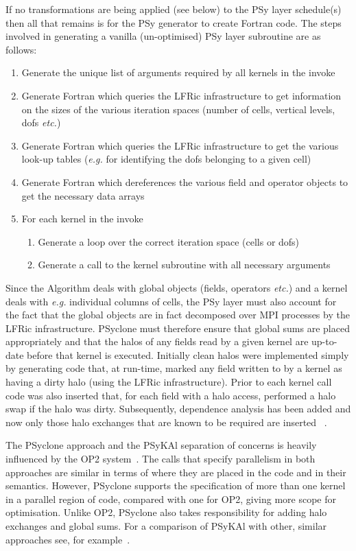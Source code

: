 \documentclass[review,times]{elsarticle}
\begin{document}
If no transformations are being applied (see below) to the PSy layer
schedule(s) then all that remains is for the PSy generator to create
Fortran code.  The steps involved in generating a vanilla
(un-optimised) PSy layer subroutine are as follows:
\begin{enumerate}
\item Generate the unique list of arguments required by all kernels
  in the invoke
\item Generate Fortran which queries the LFRic infrastructure to get
  information on the sizes of the various iteration spaces (number of cells,
  vertical levels, dofs {\em etc.})
\item Generate Fortran which queries the LFRic infrastructure to get the
  various look-up tables ({\em e.g.} for identifying the dofs belonging to a
  given cell)
\item Generate Fortran which dereferences the various field and operator
  objects to get the necessary data arrays
\item For each kernel in the invoke
  \begin{enumerate}
    \item Generate a loop over the correct iteration space (cells or dofs)
    \item Generate a call to the kernel subroutine with all necessary arguments
  \end{enumerate}
\end{enumerate}

Since the Algorithm deals with global objects
(fields, operators {\em etc.})  and a kernel deals with {\em e.g.} individual
columns of cells, the PSy layer must also account for the fact that
the global objects are in fact decomposed over MPI processes by the
LFRic infrastructure. PSyclone must therefore ensure that global sums
are placed appropriately and that the halos of any fields read by a
given kernel are up-to-date before that kernel is executed. Initially
clean halos were implemented simply by generating code that, at
run-time, marked any field written to by a kernel as having a dirty
halo (using the LFRic infrastructure). Prior to each kernel call code
was also inserted that, for each field with a halo access, performed a
halo swap if the halo was dirty. Subsequently, dependence analysis has
been added and now only those halo exchanges that are known to be
required are inserted ~\cite{psyclone}.

The PSyclone approach and the {PS}y{KA}l separation of concerns is
heavily influenced by the OP2 system~\citep{OP2, PYOP2}. The calls
that specify parallelism in both approaches are similar in terms of
where they are placed in the code and in their semantics. However,
PSyclone supports the specification of more than one kernel in a
parallel region of code, compared with one for OP2, giving more scope
for optimisation. Unlike OP2, PSyclone also takes responsibility for
adding halo exchanges and global sums. For a comparison of {PS}y{KA}l
with other, similar approaches see, for example~\cite{nemolite2d_psykal}.
\end{document}
